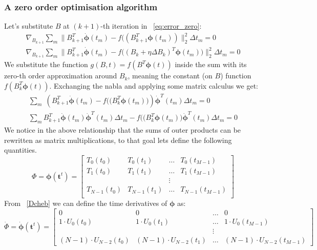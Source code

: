 \documentclass[11pt]{report}
\begin{document}
    \subsubsection{A zero order optimisation algorithm}
    Let's substitute $B$ at $(k+1)$-th iteration in ~\ref{eq:error_zero}:
    \begin{align}
        \nabla_{B_{k+1}} \sum_m \lVert
        B_{k+1}^T \pmb{\dot\phi}(t_m)  -
        f ( (B_{k+1}^T \pmb\phi(t_m)  )
        \rVert^2_2
        \Delta t_m = 0 \\
        \nabla_{B_{k+1}}\sum_m \lVert
        B_{k+1}^T \pmb{\dot\phi}(t_m)  -
        f \big( (B_{k} + \eta \Delta B_k)^T \pmb\phi(t_m)  \big)
        \rVert^2_2
        \Delta t_m = 0 \label{eq:B_inside_f}
    \end{align}
    We substitute the function $g(B, t) = f(B^T \pmb{\phi}(t) )$ inside the sum with its zero-th order
    approximation around $B_k$, meaning the constant (on $B$) function $f( B_k^T \pmb{\phi}(t) )$.
    Exchanging the nabla and applying some matrix calculus we get:
    \begin{align}
        \sum_m \;
        \left(
        B_{k+1}^T \pmb{\dot\phi}(t_m)  -
        f \big( (B_{k}^T \pmb\phi(t_m)  \big)
        \right)
        \pmb{\dot\phi}^T(t_m)
        \Delta t_m = 0 \\
        \sum_m
        B_{k+1}^T \pmb{\dot\phi}(t_m) \pmb{\dot\phi}^T(t_m) \Delta t_m-
        f \big( (B_{k}^T \pmb\phi(t_m)  \big) \pmb{\dot\phi}^T(t_m) \Delta t_m
        = 0
        \label{eq:grad_err}
    \end{align}
    We notice in the above relationship that the sums of outer products can be rewritten as matrix multiplications, to
    that goal lets define the following quantities.
    \begin{equation*}
        \Phi =  \pmb{\phi}(\pmb{t}^t)  =
        \begin{bmatrix}
            T_0(t_0)     & T_0(t_1)     & \dots & T_{0}(t_{M-1})   \\
            T_1(t_0)     & T_1(t_1)     & \dots & T_1(t_{M-1})     \\
            & & \vdots \\
            T_{N-1}(t_0) & T_{N-1}(t_1) & \dots & T_{N-1}(t_{M-1}) \\
        \end{bmatrix}\label{eq:cheb_mat}
    \end{equation*}
    From ~\eqref{Dcheb} we can define the time derivatives of $\pmb\phi$ as:
    \begin{equation*}
        \label{DPHI}
        \dot{\Phi} = \pmb{\dot\phi}(\pmb{t}^t) =
        \begin{bmatrix}
            0                        & 0                        & \dots & 0                            \\
            1\cdot U_0(t_0)          & 1\cdot U_0(t_1)          & \dots & 1\cdot U_0(t_{M-1})          \\
            & & \vdots \\
            (N-1) \cdot U_{N-2}(t_0) & (N-1) \cdot U_{N-2}(t_1) & \dots & (N-1) \cdot U_{N-2}(t_{M-1})
        \end{bmatrix}
    \end{equation*}
\end{document}
